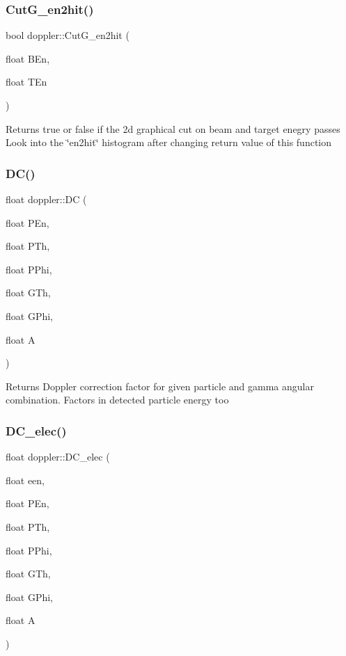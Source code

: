 \subsubsection{\texorpdfstring{Cut\+G\+\_\+en2hit()}{CutG\_en2hit()}}
{\footnotesize\ttfamily bool doppler\+::\+Cut\+G\+\_\+en2hit (\begin{DoxyParamCaption}\item[{float}]{B\+En,  }\item[{float}]{T\+En }\end{DoxyParamCaption})}

Returns true or false if the 2d graphical cut on beam and target enegry passes Look into the \char`\"{}en2hit\char`\"{} histogram after changing return value of this function \mbox{\label{classdoppler_a7f08d93d2bfa269f8c22ac71b604b09a}} 
\subsubsection{\texorpdfstring{D\+C()}{DC()}}
{\footnotesize\ttfamily float doppler\+::\+DC (\begin{DoxyParamCaption}\item[{float}]{P\+En,  }\item[{float}]{P\+Th,  }\item[{float}]{P\+Phi,  }\item[{float}]{G\+Th,  }\item[{float}]{G\+Phi,  }\item[{float}]{A }\end{DoxyParamCaption})}

Returns Doppler correction factor for given particle and gamma angular combination. Factors in detected particle energy too \mbox{\label{classdoppler_ad8387753c2288d464b64579a23d3bc4e}} 
\subsubsection{\texorpdfstring{D\+C\+\_\+elec()}{DC\_elec()}}
{\footnotesize\ttfamily float doppler\+::\+D\+C\+\_\+elec (\begin{DoxyParamCaption}\item[{float}]{een,  }\item[{float}]{P\+En,  }\item[{float}]{P\+Th,  }\item[{float}]{P\+Phi,  }\item[{float}]{G\+Th,  }\item[{float}]{G\+Phi,  }\item[{float}]{A }\end{DoxyParamCaption})}

